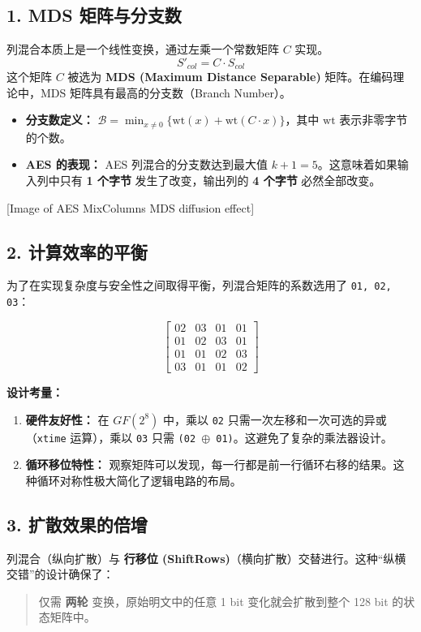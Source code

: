 \documentclass[12pt, a4paper]{article}
\begin{document}
\subsection{1. MDS 矩阵与分支数}
列混合本质上是一个线性变换，通过左乘一个常数矩阵 $C$ 实现。
$$ S'_{col} = C \cdot S_{col} $$
这个矩阵 $C$ 被选为 \textbf{MDS (Maximum Distance Separable)} 矩阵。在编码理论中，MDS 矩阵具有最高的分支数（Branch Number）。

\begin{itemize}
    \item \textbf{分支数定义：} $\mathcal{B} = \min_{x \neq 0} \{ \text{wt}(x) + \text{wt}(C \cdot x) \}$，其中 $\text{wt}$ 表示非零字节的个数。
    \item \textbf{AES 的表现：} AES 列混合的分支数达到最大值 $k+1 = 5$。这意味着如果输入列中只有 \textbf{1 个字节} 发生了改变，输出列的 \textbf{4 个字节} 必然全部改变。
\end{itemize}

[Image of AES MixColumns MDS diffusion effect]

\subsection{2. 计算效率的平衡}
为了在实现复杂度与安全性之间取得平衡，列混合矩阵的系数选用了 \texttt{01, 02, 03}：
\begin{tcolorbox}[mathbox]
$$
\begin{bmatrix}
02 & 03 & 01 & 01 \\
01 & 02 & 03 & 01 \\
01 & 01 & 02 & 03 \\
03 & 01 & 01 & 02
\end{bmatrix}
$$
\end{tcolorbox}

\textbf{设计考量：}
\begin{enumerate}
    \item \textbf{硬件友好性：} 在 $GF(2^8)$ 中，乘以 \texttt{02} 只需一次左移和一次可选的异或（\texttt{xtime} 运算），乘以 \texttt{03} 只需 \texttt{(02 $\oplus$ 01)}。这避免了复杂的乘法器设计。
    \item \textbf{循环移位特性：} 观察矩阵可以发现，每一行都是前一行循环右移的结果。这种循环对称性极大简化了逻辑电路的布局。
\end{enumerate}

\subsection{3. 扩散效果的倍增}
列混合（纵向扩散）与 \textbf{行移位 (ShiftRows)}（横向扩散）交替进行。这种“纵横交错”的设计确保了：
\begin{quote}
    仅需 \textbf{两轮} 变换，原始明文中的任意 1 bit 变化就会扩散到整个 128 bit 的状态矩阵中。
\end{quote}
\end{document}
